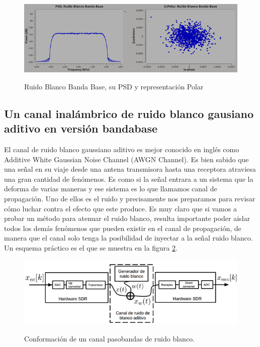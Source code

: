 \begin{figure}[h!]
	\captionsetup{justification = raggedright, singlelinecheck = false}
	\caption{Ruido Blanco Banda Base, su PSD y representación Polar} 
	\centering
	\includegraphics[scale=1]{Imagenes/Polar.png}
	\label{fig:Polar}
\end{figure}

\subsection{Un canal inalámbrico de ruido blanco gausiano aditivo en versión bandabase }
El canal de ruido blanco gaussiano aditivo es mejor conocido en inglés como Additive White Gaussian Noise Channel (AWGN Channel). Es bien sabido que una señal en su viaje desde una antena transmisora hasta una receptora atraviesa una gran cantidad de fenómenos. Es como si la señal entrara a un sistema que la deforma de varias maneras y ese sistema es lo que llamamos canal de propagación. Uno de ellos es el ruido y precisamente nos preparamos para revisar cómo luchar contra el efecto que este produce. Es muy claro que si vamos a probar un método para atenuar el ruido blanco, resulta importante poder aislar todos los demás fenómenos que pueden existir en el canal de propagación, de manera que el canal solo tenga la posibilidad de inyectar a la señal ruido blanco. Un esquema práctico es el que se muestra en la figura \ref{fig:Conformacion}.

\begin{figure}[h!]
	\captionsetup{justification = raggedright, singlelinecheck = false}
	\caption{Conformación de un canal pasobandas de ruido blanco.} 
	\centering
	\includegraphics[scale=1]{Imagenes/Conformacion.png}
	\label{fig:Conformacion}
\end{figure}

